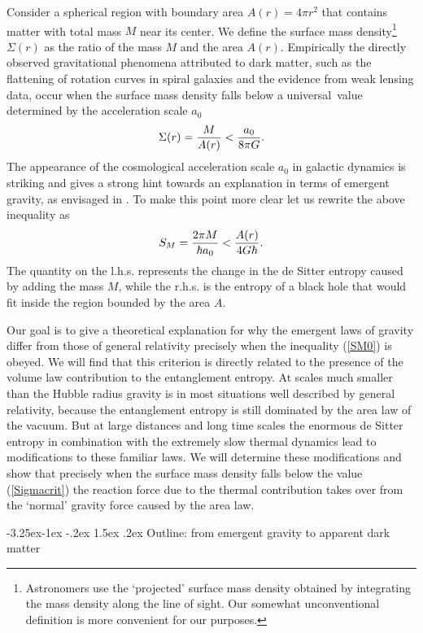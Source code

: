 \documentclass[a4paper,12pt]{article}
\makeatletter
\renewcommand\subsection{\@startsection{subsection}{2}{\z@}%
                                     {-3.25ex\@plus -1ex \@minus -.2ex}%
                                     {1.5ex \@plus .2ex}%
                                     {\normalfont\bfseries}}
\newcommand{\be}{\begin{equation}}
\newcommand{\ee}{\end{equation}}
\makeatother
\begin{document}
Consider a spherical region with boundary area $A(r)= 4\pi r^2$ that contains matter with total mass $M$ 
near its center. 
We define the surface mass density\footnote{Astronomers use the  
`projected' surface mass density obtained by integrating the mass density along 
the line of sight. Our somewhat unconventional definition is more convenient for our purposes.}
$\Sigma(r)$ as the ratio of the mass $M$ and the area $A(r)$. 
Empirically the directly observed gravitational phenomena attributed to dark matter, such as the flattening of rotation curves in spiral galaxies and the evidence from weak lensing data, occur when 
the surface mass density falls below a universal~value determined by the acceleration scale $a_0$
\be
\label{Sigmacrit}
\Sigma (r)=
{M\over A(r)}< {a_0\over 8\pi G}.   
\ee  
 The appearance of the cosmological acceleration scale $a_0$ in galactic dynamics is 
 striking and gives a strong hint towards an explanation in terms of emergent gravity, as envisaged in \cite{Milgromvac}. 
 To make this point more clear let us rewrite the above inequality as
\be
\label{SM0}
S_M= {2\pi M\over \hbar a_0} < {A(r)\over 4G\hbar}.
\ee
 The quantity on the l.h.s. represents the change in the de Sitter entropy 
caused by adding the mass $M$, while the r.h.s. is the entropy of a black hole 
that would fit inside the region bounded by the area $A$.  

Our goal is to  give a theoretical explanation for why the  emergent laws of gravity differ from those of general relativity precisely when the inequality (\ref{SM0}) is obeyed.  We will find that this criterion  is directly related to the presence of the volume law contribution to the entanglement entropy.   At scales much smaller than the Hubble radius gravity is in most situations well described by general relativity, because the entanglement entropy is still dominated by the area law of the vacuum.  But at large distances and long time scales the enormous de Sitter entropy in combination with the extremely slow thermal dynamics lead to modifications to these familiar laws. We will determine these modifications and show that precisely when the surface mass density falls below the value (\ref{Sigmacrit}) the reaction force due to the thermal contribution takes over from the `normal' gravity force caused by the area law. 


\subsection{Outline: from emergent gravity to apparent dark matter}
\end{document}
